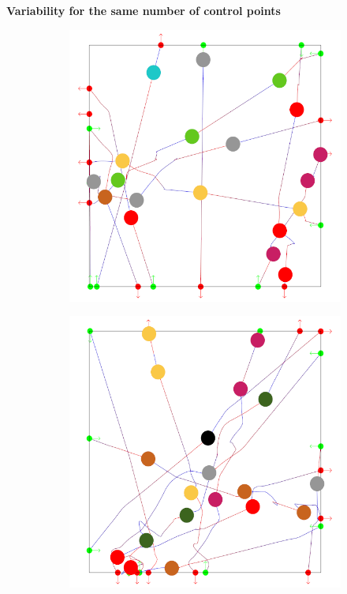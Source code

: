 \textbf{Variability for the same number of control points}

\begin{figure}[t]
 \centering
 \begin{subfigure}[b]{0.24\linewidth}
 	\includegraphics[width=\linewidth]{images/res-10-withAgents_1.png}
 	\caption{}
 \end{subfigure}
 \begin{subfigure}[b]{0.24\linewidth}
 	\includegraphics[width=\linewidth]{images/res-10-withAgents_2.png}

\end{subfigure}
\end{figure}
